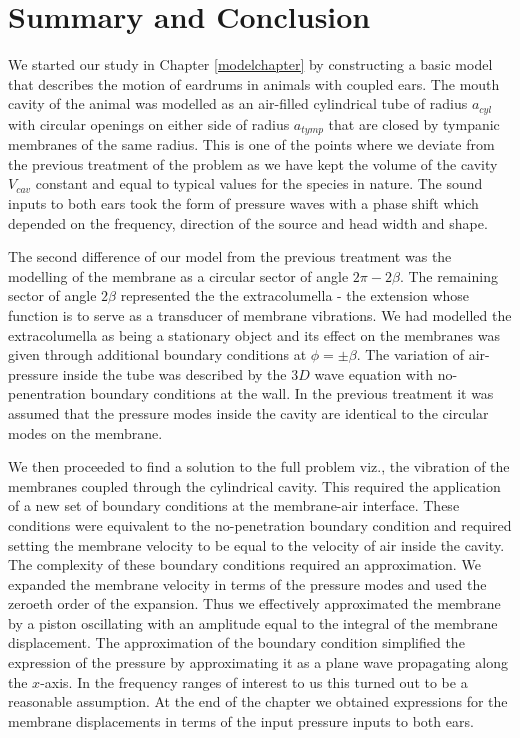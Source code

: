 \chapter{Summary and Conclusion}
We started our study in Chapter \ref{modelchapter} by constructing a basic model that describes the motion of eardrums in animals
with coupled ears. The mouth cavity of the animal was modelled as an air-filled cylindrical tube
of radius $a_{cyl}$ with circular openings on either side of radius $a_{tymp}$ that are closed by
tympanic membranes of the same radius. This is one of the points where we deviate from the previous treatment
of the problem \cite{vossenjasa} as we have kept the volume of the cavity $V_{cav}$ constant and equal to
typical values for the species in nature. The sound inputs to both ears took the form of pressure waves
with a phase shift which depended on the frequency, direction of the source and head width and shape.

The second difference of our model from the previous treatment was the modelling of the membrane
as a circular sector of angle $2\pi-2\beta$. The remaining sector of angle $2\beta$ represented the 
the extracolumella - the extension whose function is to serve as a transducer of
membrane vibrations. We had modelled the extracolumella as being a stationary object and its
effect on the membranes was given through additional boundary conditions at $\phi=\pm\beta$. The variation of air-pressure
inside the tube was described by the $3D$ wave equation with no-penentration boundary conditions at the wall. In the previous
treatment it was assumed that the pressure modes inside the cavity are identical to the circular modes on the membrane. 

We then proceeded to find a solution to the full problem viz., the vibration of the membranes coupled through the cylindrical
cavity. This required the application of a new set of boundary conditions at the membrane-air interface. These conditions were
equivalent to the no-penetration boundary condition and required setting the membrane velocity to be equal to the velocity of
air inside the cavity. The complexity of these boundary conditions required an approximation. We expanded the membrane 
velocity in terms of the pressure modes and used the zeroeth order of the expansion. Thus we effectively approximated the membrane
by a piston oscillating with an amplitude equal to the integral of the membrane displacement. The approximation of the boundary
condition simplified the expression of the pressure by approximating it as a plane wave propagating along the $x$-axis. In the
frequency ranges of interest to us this turned out to be a reasonable assumption. At the end of the chapter we obtained expressions
for the membrane displacements in terms of the input pressure inputs to both ears.

